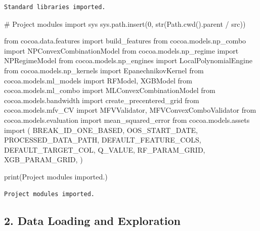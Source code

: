 \documentclass[
  letterpaper,
  DIV=11,
  numbers=noendperiod]{scrartcl}
\newenvironment{Shaded}{\begin{snugshade}}{\end{snugshade}}
\newcommand{\BuiltInTok}[1]{\textcolor[rgb]{0.00,0.23,0.31}{#1}}
\newcommand{\CommentTok}[1]{\textcolor[rgb]{0.37,0.37,0.37}{#1}}
\newcommand{\DecValTok}[1]{\textcolor[rgb]{0.68,0.00,0.00}{#1}}
\newcommand{\ImportTok}[1]{\textcolor[rgb]{0.00,0.46,0.62}{#1}}
\newcommand{\NormalTok}[1]{\textcolor[rgb]{0.00,0.23,0.31}{#1}}
\newcommand{\OperatorTok}[1]{\textcolor[rgb]{0.37,0.37,0.37}{#1}}
\newcommand{\StringTok}[1]{\textcolor[rgb]{0.13,0.47,0.30}{#1}}
\begin{document}
\begin{verbatim}
Standard libraries imported.
\end{verbatim}

\begin{Shaded}
\begin{Highlighting}[]
\CommentTok{\# Project modules}
\ImportTok{import}\NormalTok{ sys}
\NormalTok{sys.path.insert(}\DecValTok{0}\NormalTok{, }\BuiltInTok{str}\NormalTok{(Path.cwd().parent }\OperatorTok{/} \StringTok{\textquotesingle{}src\textquotesingle{}}\NormalTok{))}

\ImportTok{from}\NormalTok{ cocoa.data.features }\ImportTok{import}\NormalTok{ build\_features}
\ImportTok{from}\NormalTok{ cocoa.models.np\_combo }\ImportTok{import}\NormalTok{ NPConvexCombinationModel}
\ImportTok{from}\NormalTok{ cocoa.models.np\_regime }\ImportTok{import}\NormalTok{ NPRegimeModel}
\ImportTok{from}\NormalTok{ cocoa.models.np\_engines }\ImportTok{import}\NormalTok{ LocalPolynomialEngine}
\ImportTok{from}\NormalTok{ cocoa.models.np\_kernels }\ImportTok{import}\NormalTok{ EpanechnikovKernel}
\ImportTok{from}\NormalTok{ cocoa.models.ml\_models }\ImportTok{import}\NormalTok{ RFModel, XGBModel}
\ImportTok{from}\NormalTok{ cocoa.models.ml\_combo }\ImportTok{import}\NormalTok{ MLConvexCombinationModel}
\ImportTok{from}\NormalTok{ cocoa.models.bandwidth }\ImportTok{import}\NormalTok{ create\_precentered\_grid}
\ImportTok{from}\NormalTok{ cocoa.models.mfv\_CV }\ImportTok{import}\NormalTok{ MFVValidator, MFVConvexComboValidator}
\ImportTok{from}\NormalTok{ cocoa.models.evaluation }\ImportTok{import}\NormalTok{ mean\_squared\_error}
\ImportTok{from}\NormalTok{ cocoa.models.assets }\ImportTok{import}\NormalTok{ (}
\NormalTok{    BREAK\_ID\_ONE\_BASED, OOS\_START\_DATE, PROCESSED\_DATA\_PATH,}
\NormalTok{    DEFAULT\_FEATURE\_COLS, DEFAULT\_TARGET\_COL, Q\_VALUE,}
\NormalTok{    RF\_PARAM\_GRID, XGB\_PARAM\_GRID,}
\NormalTok{)}

\BuiltInTok{print}\NormalTok{(}\StringTok{\textquotesingle{}Project modules imported.\textquotesingle{}}\NormalTok{)}
\end{Highlighting}
\end{Shaded}

\begin{verbatim}
Project modules imported.
\end{verbatim}

\subsection{2. Data Loading and
Exploration}\label{data-loading-and-exploration}
\end{document}
